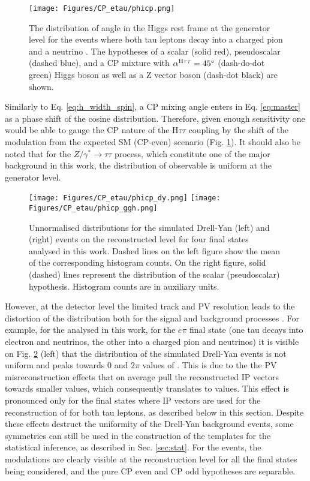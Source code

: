 \begin{figure}[t!]
    \centering
    \texttt{[image: Figures/CP\_etau/phicp.png]}
    \caption{The distribution of \phicp angle in the Higgs rest frame at the generator level for the \htt events where both tau leptons decay into a charged pion and a neutrino \cite{CMS:2021sdq}. The hypotheses of a scalar (solid red), pseudoscalar (dashed blue), and a CP mixture with $\alpha^{\text{H}\tau\tau}=45^\circ$ (dash-do-dot green) Higgs boson as well as a Z vector boson (dash-dot black) are shown.}
    \label{fig:phicp}
\end{figure}

Similarly to Eq. \ref{eq:h_width_spin}, a CP mixing angle \mixa enters in Eq. \ref{eq:master} as a phase shift of the cosine distribution. Therefore, given enough sensitivity one would be able to gauge the CP nature of the $\text{H}\tau\tau$ coupling by the shift of the modulation from the expected SM (CP-even) scenario (Fig. \ref{fig:phicp}). It should also be noted that for the $Z/\gamma^* \to \tau\tau$ process, which constitute one of the major background in this work, the distribution of \phicp observable is uniform at the generator level. 

\begin{figure}[t!]
    \centering
    \texttt{[image: Figures/CP\_etau/phicp\_dy.png]}
    \texttt{[image: Figures/CP\_etau/phicp\_ggh.png]}
    \caption{Unnormalised \phicp distributions for the simulated Drell-Yan (left) and \htt (right) events on the reconstructed level for four final states analysed in this work. Dashed lines on the left figure show the mean of the corresponding histogram counts. On the right figure, solid (dashed) lines represent the distribution of the scalar (pseudoscalar) \htt hypothesis. Histogram counts are in auxiliary units.}
    \label{fig:phicp_e}
\end{figure}

However, at the detector level the limited track and PV resolution leads to the distortion of the \phicp distribution both for the signal and background processes \cite{Berge:2014sra}. For example, for the \et analysed in this work, for the $e\pi$ final state (one tau decays into electron and neutrinos, the other into a charged pion and neutrinos) it is visible on Fig. \ref{fig:phicp_e} (left) that the distribution of the simulated Drell-Yan events is not uniform and peaks towards $0$ and $2\pi$ values of \phicp. This is due to the the PV misreconstruction effects that on average pull the reconstructed IP vectors towards smaller values, which consequently translates to \phicp values. This effect is pronounced only for the final states where IP vectors are used for the reconstruction of \phicp for both tau leptons, as described below in this section. Despite these effects destruct the uniformity of the Drell-Yan background events, some symmetries can still be used in the construction of the templates for the statistical inference, as described in Sec. \ref{sec:stat}. For the \htt events, the modulations are clearly visible at the reconstruction level for all the final states being considered, and the pure CP even and CP odd hypotheses are separable. 

